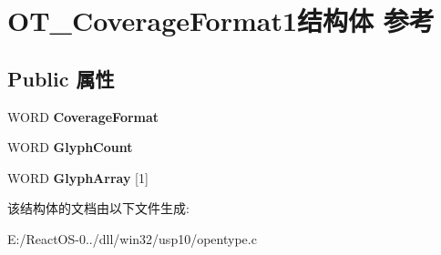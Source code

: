 \hypertarget{struct_o_t___coverage_format1}{}\section{O\+T\+\_\+\+Coverage\+Format1结构体 参考}
\label{struct_o_t___coverage_format1}
\subsection*{Public 属性}
\begin{DoxyCompactItemize}
\item 
\mbox{\label{struct_o_t___coverage_format1_a7a037ab64ea7dff075fa6a4b9cea6cbe}} 
W\+O\+RD {\bfseries Coverage\+Format}
\item 
\mbox{\label{struct_o_t___coverage_format1_a54c6576465c1785fa12eba161a289501}} 
W\+O\+RD {\bfseries Glyph\+Count}
\item 
\mbox{\label{struct_o_t___coverage_format1_a9274c8cdc052b6e7b71ccde1d22c552b}} 
W\+O\+RD {\bfseries Glyph\+Array} \mbox{[}1\mbox{]}
\end{DoxyCompactItemize}


该结构体的文档由以下文件生成\+:\begin{DoxyCompactItemize}
\item 
E\+:/\+React\+O\+S-\/0../dll/win32/usp10/opentype.\+c\end{DoxyCompactItemize}
